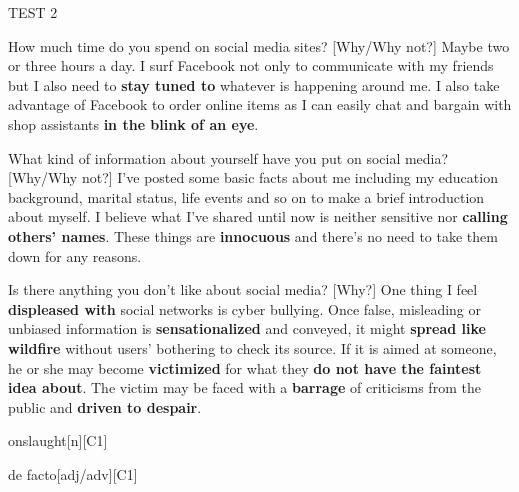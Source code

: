 \begin{glossarymc}[Cambridge 14]
\begin{test}{TEST 2}
    \begin{qa}{How much time do you spend on social media sites? [Why/Why not?]}
    Maybe two or three hours a day. I surf Facebook not only to communicate with my friends but I also need to \textbf{stay tuned to} whatever is happening around me. I also take advantage of Facebook to order online items as I can easily chat and bargain with shop assistants \textbf{in the blink of an eye}.
    \end{qa}

    \begin{qa}{What kind of information about yourself have you put on social media? [Why/Why not?]}
    I’ve posted some basic facts about me including my education background, marital status, life events and so on to make a brief introduction about myself. I believe what I’ve shared until now is neither sensitive nor \textbf{calling others’ names}. These things are \textbf{innocuous} and there’s no need to take them down for any reasons.
    \end{qa}

    \begin{qa}{Is there anything you don’t like about social media? [Why?]}
    One thing I feel \textbf{displeased with} social networks is cyber bullying. Once false, misleading or unbiased information is \textbf{sensationalized} and conveyed, it might \textbf{spread like wildfire} without users’ bothering to check its source. If it is aimed at someone, he or she may become \textbf{victimized} for what they \textbf{do not have the faintest idea about}. The victim may be faced with a \textbf{barrage} of criticisms from the public and \textbf{driven to despair}.
    \end{qa}

        \begin{VocabExplain}[Part 1]
            \begin{ExplainCard}{onslaught}[n][C1]
            \end{ExplainCard}

            \begin{ExplainCard}{de facto}[adj/adv][C1]
            \end{ExplainCard}


\end{VocabExplain}
\end{test}
\end{glossarymc}
